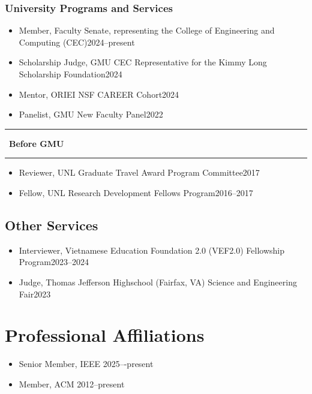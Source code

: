 \documentclass[11pt]{article}
\newcommand{\beforegmu}{\begin{center}\rule{2in}{0.8pt}~\textbf{Before GMU}~\rule{2in}{0.8pt}\end{center}}
\begin{document}
\myunitservices{}


\subsubsection{University Programs and Services}
\begin{itemize}
    \item Member, Faculty Senate, representing the College of Engineering and Computing (CEC)\hfill 2024--present    
    \item Scholarship Judge, GMU CEC Representative for the Kimmy Long Scholarship Foundation\hfill 2024
    \item Mentor, ORIEI NSF CAREER Cohort\hfill 2024
    \item Panelist, GMU New Faculty Panel\hfill 2022
\end{itemize}
\vspace{0.1in}
\beforegmu{}
\vspace{0.1in}
\begin{itemize}
    \item Reviewer,  UNL Graduate Travel Award Program Committee\hfill 2017
    \item Fellow, UNL Research Development Fellows Program\hfill 2016--2017
\end{itemize}


\subsection{Other Services}
\begin{itemize}
    \item  Interviewer, Vietnamese Education Foundation 2.0 (VEF2.0) Fellowship Program\hfill 2023--2024
    \item Judge, Thomas Jefferson Highschool (Fairfax, VA) Science and Engineering Fair\hfill 2023
\end{itemize}

\section{Professional Affiliations}
\begin{itemize}
    \item Senior Member, IEEE \hfill 2025–-present
    \item Member, ACM \hfill 2012--present
\end{itemize}
\end{document}
